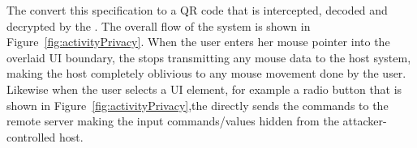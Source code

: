  The \name \js convert this specification to a QR code that is intercepted, decoded and decrypted by the \device. The overall flow of the system is shown in Figure~\ref{fig:activityPrivacy}. When the user enters her mouse pointer into the overlaid UI boundary, the \device stops transmitting any mouse data to the host system, making the host completely oblivious to any mouse movement done by the user. Likewise when the user selects a UI element, for example a radio button that is shown in Figure~\ref{fig:activityPrivacy},the \device directly sends the commands to the remote server making the input commands/values hidden from the attacker-controlled host.  




